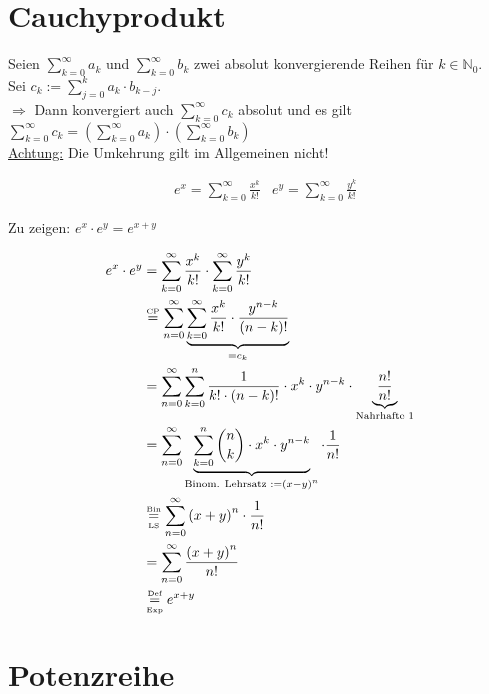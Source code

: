 \documentclass[a4paper,12pt]{article}
\begin{document}
	\section{Cauchyprodukt}
	\begin{defi}
		Seien $\sum_{k=0}^{\infty} a_k$ und $\sum_{k=0}^{\infty} b_k$ zwei absolut konvergierende Reihen für $k \in \mathbb{N}_0$.\\
		Sei $c_k := \sum_{j=0}^{k} a_k \cdot b_{k-j}$.\\
		
		$\Rightarrow$ Dann konvergiert auch $\sum_{k=0}^{\infty} c_k$ absolut und es gilt\\
		$\sum_{k=0}^{\infty} c_k = \left(\sum_{k=0}^{\infty} a_k\right) \cdot \left(\sum_{k=0}^{\infty} b_k\right)$\\
		
		\underline{Achtung:} Die Umkehrung gilt im Allgemeinen nicht!
	\end{defi}
	\begin{bsp}
		\begin{align*}
			&e^x = \sum_{k=0}^{\infty} \frac{x^k}{k!} &e^y = \sum_{k=0}^{\infty} \frac{y^k}{k!}
		\end{align*}
		\begin{center}
			Zu zeigen: $e^x \cdot e^y = e^{x+y}$
		\end{center}
	\end{bsp}
	\begin{align*}
		e^x \cdot e^y &= \sum_{k=0}^{\infty} \frac{x^k}{k!} \cdot \sum_{k=0}^{\infty} \frac{y^k}{k!}\\
		&\overset{\text{\tiny CP}}{=} \sum_{n=0}^{\infty} \underbrace{\sum_{k=0}^{\infty} \frac{x^k}{k!} \cdot \frac{y^{n-k}}{\left(n-k\right)!}}_{= c_k}\\
		&= \sum_{n=0}^{\infty} \sum_{k=0}^{n} \frac{1}{k! \cdot \left(n-k\right)!} \cdot x^k \cdot y^{n-k} \cdot \underbrace{\frac{n!}{n!}}_{\text{Nahrhafte 1}}\\
		&= \sum_{n=0}^{\infty} \underbrace{\sum_{k=0}^{n} \binom{n}{k} \cdot x^k \cdot y^{n-k}}_{\text{Binom. Lehrsatz }:= \left(x-y\right)^n} \cdot \frac{1}{n!}\\
		&\overset{\text{\tiny Bin}}{\underset{\text{\tiny LS}}{=}} \sum_{n=0}^{\infty} \left(x+y\right)^n \cdot \frac{1}{n!}\\
		&= \sum_{n=0}^{\infty} \frac{\left(x+y\right)^n}{n!}\\
		&\overset{\text{\tiny Def}}{\underset{\text{\tiny Exp}}{=}} e^{x+y}
	\end{align*}
	
	\section{Potenzreihe}
\end{document}
